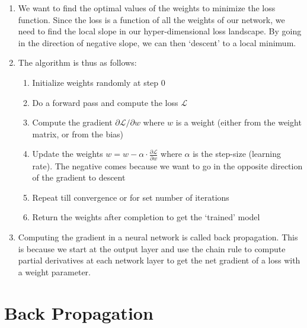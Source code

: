 \documentclass{article}
\begin{document}
\begin{enumerate}
    \item We want to find the optimal values of the weights to minimize the loss function. Since the loss is a function of all the weights of our network, we need to find the local slope in our hyper-dimensional loss landscape. By going in the direction of negative slope, we can then `descent' to a local minimum.
    \item The algorithm is thus as follows: 
        \begin{enumerate}
            \item Initialize weights randomly at step 0
            \item Do a forward pass and compute the loss $\mathcal{L}$ 
            \item Compute the gradient ${\partial \mathcal{L}}/{\partial w}$ where $w$ is a weight (either from the weight matrix, or from the bias)
            \item Update the weights $w = w-\alpha\cdot\frac{\partial \mathcal{L}}{\partial w}$ where $\alpha$ is the step-size (learning rate). The negative comes because we want to go in the opposite direction of the gradient to descent
            \item Repeat till convergence or for set number of iterations
            \item Return the weights after completion to get the `trained' model
        \end{enumerate}

    \item Computing the gradient in a neural network is called back propagation. This is because we start at the output layer and use the chain rule to compute partial derivatives at each network layer to get the net gradient of a loss with a weight parameter. 

\end{enumerate}

\section{Back Propagation}
\end{document}
